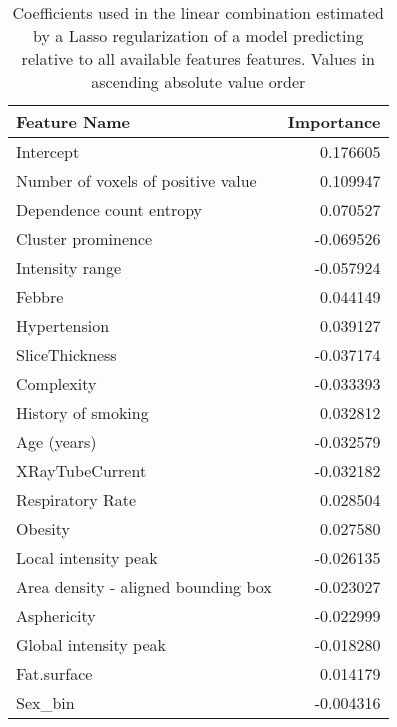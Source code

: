 \begin{table}
	\caption{Coefficients used in the linear combination estimated by a Lasso regularization of a model predicting \icu relative to all available features features. Values in ascending absolute value order\label{tab:ParamAll}}
		\centering
		\begin{tabular}{lr}
		\toprule
		Feature Name &   Importance \\
		\midrule
		Intercept                           &                      0.176605 \\
		Number of voxels of positive value  &                      0.109947 \\
		Dependence count entropy            &                      0.070527 \\
		Cluster prominence                  &                     -0.069526 \\
		Intensity range                     &                     -0.057924 \\
		Febbre                              &                      0.044149 \\
		Hypertension                        &                      0.039127 \\
		SliceThickness                      &                     -0.037174 \\
		Complexity                          &                     -0.033393 \\
		History of smoking                  &                      0.032812 \\
		Age (years)                         &                     -0.032579 \\
		XRayTubeCurrent                     &                     -0.032182 \\
		Respiratory Rate                    &                      0.028504 \\
		Obesity                             &                      0.027580 \\
		Local intensity peak                &                     -0.026135 \\
		Area density - aligned bounding box &                     -0.023027 \\
		Asphericity                         &                     -0.022999 \\
		Global intensity peak               &                     -0.018280 \\
		Fat.surface                         &                      0.014179 \\
		Sex\_bin                             &                     -0.004316 \\

\end{tabular}
\end{table}
